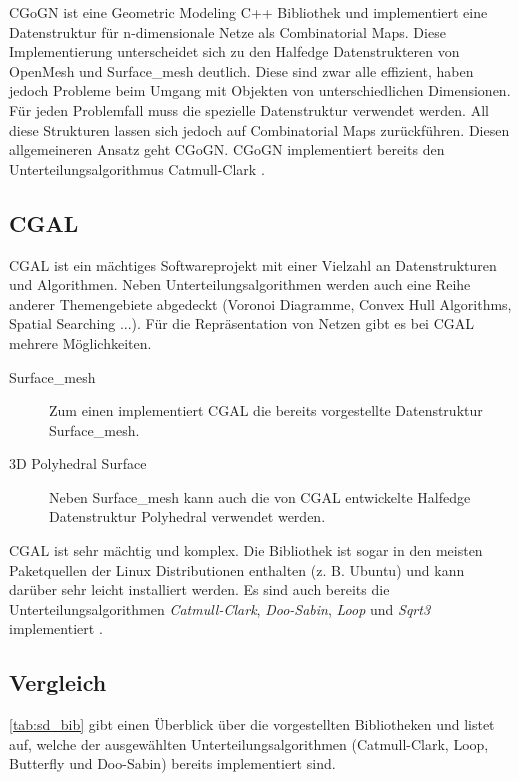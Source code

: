 CGoGN ist eine Geometric Modeling C++ Bibliothek und implementiert eine Datenstruktur für n-dimensionale Netze als Combinatorial Maps.
Diese Implementierung unterscheidet sich zu den Halfedge Datenstrukteren von OpenMesh und Surface\_mesh deutlich.
Diese sind zwar alle effizient, haben jedoch Probleme beim Umgang mit Objekten von unterschiedlichen Dimensionen.
Für jeden Problemfall muss die spezielle Datenstruktur verwendet werden.
All diese Strukturen lassen sich jedoch auf Combinatorial Maps zurückführen.
Diesen allgemeineren Ansatz geht CGoGN.
CGoGN implementiert bereits den Unterteilungsalgorithmus Catmull-Clark \cite{CGoGN.27.07.2015}. 

\subsection{CGAL}

\ac{CGAL} ist ein mächtiges Softwareprojekt mit einer Vielzahl an Datenstrukturen und Algorithmen.
Neben Unterteilungsalgorithmen werden auch eine Reihe anderer Themengebiete abgedeckt (Voronoi Diagramme, Convex Hull Algorithms, Spatial Searching ...).
Für die Repräsentation von Netzen gibt es bei \ac{CGAL} mehrere Möglichkeiten.

\begin{description}
 \item[Surface\_mesh] Zum einen implementiert \ac{CGAL} die bereits vorgestellte Datenstruktur Surface\_mesh.
 \item[3D Polyhedral Surface] Neben Surface\_mesh kann auch die von \ac{CGAL} entwickelte Halfedge Datenstruktur Polyhedral verwendet werden.
\end{description}

\ac{CGAL} ist sehr mächtig und komplex. Die Bibliothek ist sogar in den meisten Paketquellen der Linux Distributionen enthalten (z. B. Ubuntu)
und kann darüber sehr leicht installiert werden.
Es sind auch bereits die Unterteilungsalgorithmen \emph{Catmull-Clark}, \emph{Doo-Sabin}, \emph{Loop} und \emph{Sqrt3} implementiert \cite{CGAL.27.07.2015}.

\subsection{Vergleich}

\autoref{tab:sd_bib} gibt einen Überblick über die vorgestellten Bibliotheken und listet auf, welche der ausgewählten Unterteilungsalgorithmen
(Catmull-Clark, Loop, Butterfly und Doo-Sabin) bereits implementiert sind.

